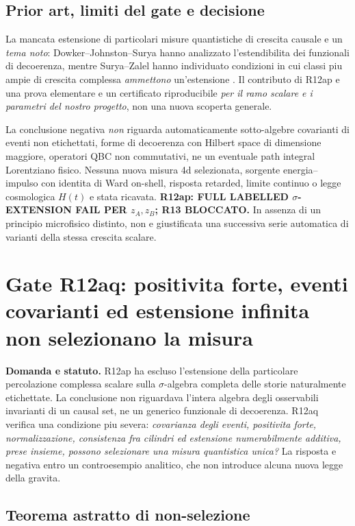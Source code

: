 \documentclass[11pt,a4paper]{article}
\begin{document}
\subsection{Prior art, limiti del gate e decisione}

La mancata estensione di particolari misure quantistiche di crescita causale e un \emph{tema noto}: Dowker--Johnston--Surya hanno analizzato l'estendibilita dei funzionali di decoerenza, mentre Surya--Zalel hanno individuato condizioni in cui classi piu ampie di crescita complessa \emph{ammettono} un'estensione \cite{DowkerJohnstonSurya2010,SuryaZalel2020,Surya2019Review}. Il contributo di R12ap e una prova elementare e un certificato riproducibile \emph{per il ramo scalare e i parametri del nostro progetto}, non una nuova scoperta generale.

La conclusione negativa \emph{non} riguarda automaticamente sotto-algebre covarianti di eventi non etichettati, forme di decoerenza con Hilbert space di dimensione maggiore, operatori QBC non commutativi, ne un eventuale path integral Lorentziano fisico. Nessuna nuova misura 4d selezionata, sorgente energia--impulso con identita di Ward on-shell, risposta retarded, limite continuo o legge cosmologica $H(t)$ e stata ricavata. \textbf{R12ap: FULL LABELLED $\sigma$-EXTENSION FAIL PER $z_A,z_B$; R13 BLOCCATO.} In assenza di un principio microfisico distinto, non e giustificata una successiva serie automatica di varianti della stessa crescita scalare.

\section{Gate R12aq: positivita forte, eventi covarianti ed estensione infinita non selezionano la misura}
\label{sec:r12aq}

\textbf{Domanda e statuto.} R12ap ha escluso l'estensione della particolare percolazione
complessa scalare sulla $\sigma$-algebra completa delle storie naturalmente etichettate.
La conclusione non riguardava l'intera algebra degli osservabili invarianti di un causal
set, ne un generico funzionale di decoerenza. R12aq verifica una condizione piu severa:
\emph{covarianza degli eventi, positivita forte, normalizzazione, consistenza fra
cilindri ed estensione numerabilmente additiva, prese insieme, possono selezionare una
misura quantistica unica?} La risposta e negativa entro un controesempio analitico,
che non introduce alcuna nuova legge della gravita.

\subsection{Teorema astratto di non-selezione}
\end{document}
